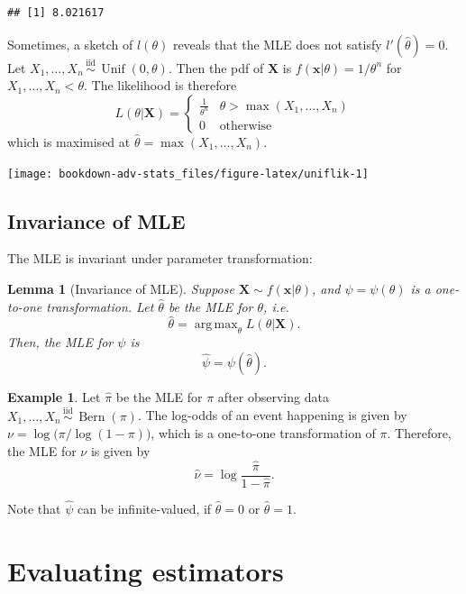 \documentclass[
]{book}
\newcommand{\bx}{{\boldsymbol x}}
\newcommand{\bX}{{\boldsymbol X}}
\DeclareMathOperator{\Bern}{Bern}
\DeclareMathOperator{\Unif}{Unif}
\newcommand{\iid}{\,\overset{\text{iid}}{\sim}\,}
\DeclareMathOperator*{\argmax}{arg\,max}
\newtheorem{lemma}{Lemma}[chapter]
\theoremstyle{definition}
\theoremstyle{definition}
\newtheorem{example}{Example}[chapter]
\theoremstyle{definition}
\theoremstyle{definition}
\theoremstyle{remark}
\begin{document}
\begin{verbatim}
## [1] 8.021617
\end{verbatim}

Sometimes, a sketch of \(l(\theta)\) reveals that the MLE does not satisfy \(l'(\hat\theta)=0\).
Let \(X_1,\dots,X_n\iid\Unif(0,\theta)\). Then the pdf of \(\bX\) is \(f(\bx|\theta) = 1/\theta^n\) for \(X_1,\dots,X_n < \theta\). The likelihood is therefore
\[
L(\theta|\bX) = \begin{cases}
\frac{1}{\theta^n} &\theta > \max(X_1,\dots,X_n) \\
0 &\text{otherwise}
\end{cases}
\]
which is maximised at \(\hat\theta = \max(X_1,\dots,X_n)\).

\begin{center}\texttt{[image: bookdown-adv-stats\_files/figure-latex/uniflik-1]} \end{center}

\hypertarget{invariance-of-mle}{%
\subsection{Invariance of MLE}\label{invariance-of-mle}}

The MLE is invariant under parameter transformation:

\begin{lemma}[Invariance of MLE]
Suppose $\bX\sim f(\bx|\theta)$, and $\psi=\psi(\theta)$ is a
one-to-one transformation. Let $\hat\theta$ be the MLE for $\theta$,
i.e. $$\hat\theta = \argmax_\theta L(\theta|\bX).$$ Then, the MLE for
$\psi$ is $$\hat\psi = \psi(\hat\theta).$$
\end{lemma}

\begin{example}
Let \(\hat\pi\) be the MLE for \(\pi\) after observing data
\(X_1,\dots,X_n\iid \Bern(\pi)\). The log-odds of an event happening is
given by \(\nu = \log\big(\pi/\log(1-\pi)\big)\), which is a one-to-one
transformation of \(\pi\). Therefore, the MLE for \(\nu\) is given by
\[\hat\nu = \log \frac{\hat\pi}{1-\hat\pi}.\]

Note that \(\hat\psi\) can be infinite-valued, if \(\hat\theta=0\) or \(\hat\theta=1\).
\end{example}

\hypertarget{evaluating-estimators}{%
\section{Evaluating estimators}\label{evaluating-estimators}}
\end{document}
